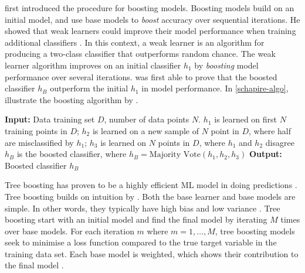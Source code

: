 \textcite{schapire-the-strength-of-weak-learners} first introduced the procedure for boosting models. Boosting models build on an initial model, and use base models to \textit{boost} accuracy over sequential iterations. He showed that weak learners could improve their model performance when training additional classifiers \parencite{schapire-the-strength-of-weak-learners}. In this context, a weak learner is an algorithm for producing a two-class classifier that outperforms random chance. The weak learner algorithm improves on an initial classifier $h_1$ by \textit{boosting} model performance over several iterations. \textcite{schapire-the-strength-of-weak-learners} was first able to prove that the boosted classifier $h_B$ outperform the initial $h_1$ in model performance. In \autoref{schapire-algo}, \textcite{friedman-additive-logistic-regression} illustrate the boosting algorithm by \textcite{schapire-the-strength-of-weak-learners}. 

\begin{algorithm}[H]
\caption{Schapire Weak Learner Algorithm \parencite{friedman-additive-logistic-regression}}
\label{schapire-algo}
\begin{algorithmic}[1]
\Statex \textbf{Input:} Data training set $D$, number of data points $N$.
\State $h_1$ is learned on first $N$ training points in $D$;
\State $h_2$ is learned on a new sample of $N$ point in $D$, where half are misclassified by $h_1$;
\State $h_3$ is learned on $N$ points in $D$, where $h_1$ and $h_2$ disagree
\State $h_B$ is the boosted classifier, where $h_B = \text{Majority Vote}(h_1,h_2,h_3)$
\Statex \textbf{Output:} Boosted classifier $h_B$
\end{algorithmic}
\end{algorithm}

Tree boosting has proven to be a highly efficient ML model in doing predictions \parencite{xgboost-a-scaleable-tree-boosting-system}. Tree boosting builds on intuition by \textcite{schapire-the-strength-of-weak-learners}. Both the base learner and base models are simple. In other words, they typically have high bias and low variance \parencite{ntnu-thesis-why-does-xgboost-win-every-machine-learning-competition}. Tree boosting start with an initial model and find the final model by iterating $M$ times over base models. For each iteration $m$ where $m=1,\dots,M$, tree boosting models seek to minimise a loss function compared to the true target variable in the training data set. Each base model is weighted, which shows their contribution to the final model \parencite{ntnu-thesis-why-does-xgboost-win-every-machine-learning-competition}. 

